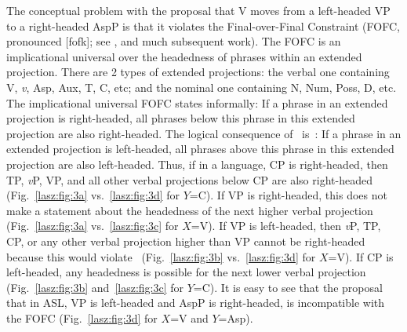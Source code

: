 \documentclass[output=paper,colorlinks,citecolor=brown,
]{langscibook}
\begin{document}
The conceptual problem with the proposal that V moves from a
left-headed VP to a right-headed AspP is that it violates the
Final-over-Final Constraint (FOFC, pronounced [fofk]; see 
\citealp{BiberauerHR.2014,SheehanBRH.2017}, and much subsequent work). The
FOFC is an implicational universal over the headedness of phrases
within an extended projection. There are 2 types of extended
projections: the verbal one containing V, \textit{v}, Asp, Aux, T, C, etc; and
the nominal one containing N, Num, Poss, D, etc. The implicational
universal FOFC states informally:
\ea 
    \label{lasz:ex:28}
     If a phrase in an extended projection is right-headed, all
    phrases below this phrase in this extended projection are also
    right-headed. \citep[after][]{BiberauerHR.2014}
\z 
The logical consequence of~ is~:
\ea 
    \label{lasz:ex:29}
    If a phrase in an extended projection is left-headed, all
    phrases above this phrase in this extended projection are also
    left-headed.
\z 
Thus, if in a language, CP is right-headed, then TP, \textit{v}P, VP, and all
other verbal projections below CP are also right-headed (Fig.~\ref{lasz:fig:3a} vs.~\ref{lasz:fig:3d}
for $Y$=C). If VP is right-headed, this does not make a statement about
the headedness of the next higher verbal projection (Fig.~\ref{lasz:fig:3a} vs.~\ref{lasz:fig:3c} for
$X$=V). If VP is left-headed, then \textit{v}P, TP, CP, or any other verbal
projection higher than VP cannot be right-headed because this would
violate~ (Fig.~\ref{lasz:fig:3b} vs.~\ref{lasz:fig:3d} for $X$=V). If CP is left-headed, any
headedness is possible for the next lower verbal projection (Fig.~\ref{lasz:fig:3b}
and~\ref{lasz:fig:3c} for $Y$=C). It is easy to see that the proposal that in ASL, VP is
left-headed and AspP is right-headed, is incompatible with the FOFC
(Fig.~\ref{lasz:fig:3d} for $X$=V and $Y$=Asp).
\end{document}
